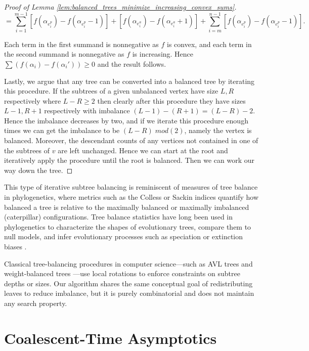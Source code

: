 \begin{subappendices}
\begin{proof}[Proof of Lemma \ref{lem:balanced_trees_minimize_increasing_convex_sums}]
\[= \sum_{i=1}^{m-1} [f(\alpha_{e_i^p}) -  f(\alpha_{e_i^p} - 1)] + [f(\alpha_{e_i^a}) -  f(\alpha_{e_i^a} + 1)] + \sum_{i=m}^{n-1} [f(\alpha_{e_i^p}) -  f(\alpha_{e_i^p} - 1)].\]

\noindent Each term in the first summand is nonnegative as $f$ is convex, and each term in the second summand is nonnegative as $f$ is increasing. Hence $\sum (f(\alpha_i) - f(\alpha_i')) \geq 0$ and the result follows.


Lastly, we argue that any tree can be converted into a balanced tree by iterating this procedure. If the subtrees of a given unbalanced vertex have size $L,R$ respectively where $L-R \geq 2$ then clearly after this procedure they have sizes $L-1, R+1$ respectively with imbalance $(L-1) - (R+1) = (L-R) - 2$. Hence the imbalance decreases by two, and if we iterate this procedure enough times we can get the imbalance to be $(L-R) \; mod(2)$, namely the vertex is balanced. Moreover, the descendant counts of any vertices not contained in one of the subtrees of $v$ are left unchanged. Hence we can start at the root and iteratively apply the procedure until the root is balanced. Then we can work our way down the tree.
\end{proof}

This type of iterative subtree balancing is reminiscent of measures of tree balance in phylogenetics, where metrics such as the Colless or Sackin indices quantify how balanced a tree is relative to the maximally balanced or maximally imbalanced (caterpillar) configurations. Tree balance statistics have long been used in phylogenetics to characterize the shapes of evolutionary trees, compare them to null models, and infer evolutionary processes such as speciation or extinction biases \cite{kersting2025_tree_balance_phylogenetic_models}.

Classical tree-balancing procedures in computer science—such as AVL trees \cite{adelson1962_avl_information_organization} and weight-balanced trees \cite{nievergelt1973_bounded_balance_binary_search_trees}—use local rotations to enforce constraints on subtree depths or sizes. Our algorithm shares the same conceptual goal of redistributing leaves to reduce imbalance, but it is purely combinatorial and does not maintain any search property.
\section{Coalescent-Time Asymptotics}
\label{app:asymptotic-results}
\label{app:coalescent-asymptotics-proof}


\end{subappendices}
